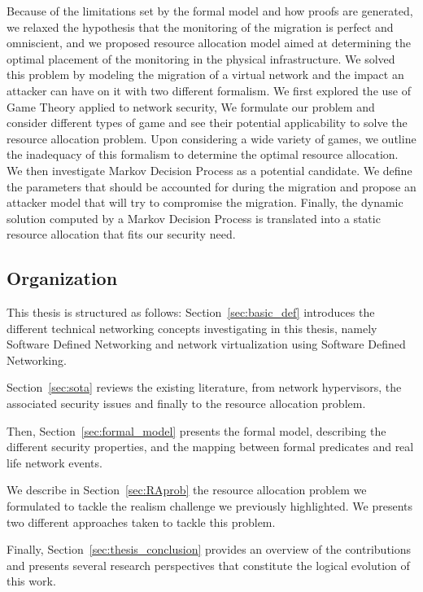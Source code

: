 Because of the limitations set by the formal model and how proofs are generated, we relaxed the hypothesis that the monitoring of the migration is perfect and omniscient, and we proposed resource allocation model aimed at determining the optimal placement of the monitoring in the physical infrastructure. We solved this problem by modeling the migration of a virtual network and the impact an attacker can have on it with two different formalism. We first explored the use of Game Theory applied to network security, We formulate our problem and consider different types of game and see their potential applicability to solve the resource allocation problem. Upon considering a wide variety of games, we outline the inadequacy of this formalism to determine the optimal resource allocation.
We then investigate Markov Decision Process as a potential candidate. We define the parameters that should be accounted for during the migration and propose an attacker model that will try to compromise the migration. Finally, the dynamic solution computed by a Markov Decision Process is translated into a static resource allocation that fits our security need.

\subsection{Organization}
This thesis is structured as follows: 
Section~\ref{sec:basic_def} introduces the different technical networking concepts investigating in this thesis, namely Software Defined Networking and network virtualization using Software Defined Networking. 

Section~\ref{sec:sota} reviews the existing literature, from network hypervisors, the associated security issues and finally to the resource allocation problem. 

Then, Section~\ref{sec:formal_model} presents the formal model, describing the different security properties, and the mapping between formal predicates and real life network events.

We describe in Section~\ref{sec:RAprob} the resource allocation problem we formulated to tackle the realism challenge we previously highlighted.
We presents two different approaches taken to tackle this problem.

Finally, Section~\ref{sec:thesis_conclusion} provides an overview of the contributions and presents several research perspectives that constitute the logical evolution of this work. 
